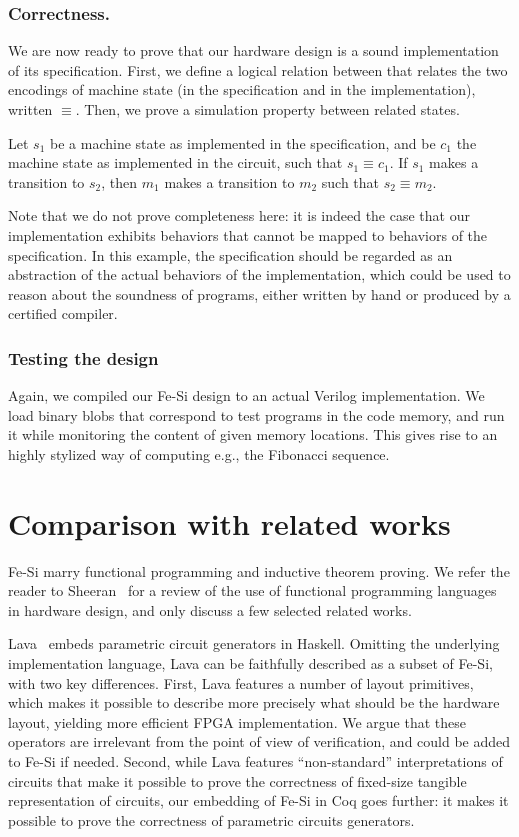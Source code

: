 \documentclass{llncs}
\begin{document}
\subsubsection{Correctness.} We are now ready to prove that our
hardware design is a sound implementation of its specification. 
%
First, we define a logical relation between that relates the two
encodings of machine state (in the specification and in the
implementation), written $\equiv$. 
%
Then, we prove a simulation property between related states.
\begin{theorem}
  Let $s_1$ be a machine state as implemented in the specification, and
  be $c_1$ the machine state as implemented in the circuit, such that
  $s_1 \equiv c_1$.
%
  If $s_1$ makes a transition to $s_2$, then $m_1$ makes a transition
  to $m_2$ such that $s_2 \equiv m_2$.
\end{theorem}
Note that we do not prove completeness here: it is indeed the case
that our implementation exhibits behaviors that cannot be mapped to
behaviors of the specification. 
%
In this example, the specification should be regarded as an
abstraction of the actual behaviors of the implementation, which could
be used to reason about the soundness of programs, either written by
hand or produced by a certified compiler.
%

\subsubsection{Testing the design}
Again, we compiled our Fe-Si design to an actual Verilog
implementation. We load binary blobs that correspond to test programs
in the code memory, and run it while monitoring the content of given
memory locations. This gives rise to an highly stylized way of
computing e.g., the Fibonacci sequence.

\section{Comparison with related works}\label{sec:rw}
Fe-Si marry functional programming and inductive theorem proving.
%
We refer the reader to Sheeran~\cite{DBLP:journals/jucs/Sheeran05} for
a review of the use of functional programming languages in hardware
design, and only discuss a few selected related works.

\medskip

Lava~\cite{Bjesse98lava:hardware} embeds parametric circuit generators
in Haskell. 
%
Omitting the underlying implementation language, Lava can be
faithfully described as a subset of Fe-Si, with two key differences.
%
First, Lava features a number of layout primitives, which makes it
possible to describe more precisely what should be the hardware
layout, yielding more efficient FPGA implementation. We argue that
these operators are irrelevant from the point of view of verification,
and could be added to Fe-Si if needed.
%
Second, while Lava features ``non-standard'' interpretations of
circuits that make it possible to prove the correctness of fixed-size
tangible representation of circuits, our embedding of Fe-Si in Coq
goes further: it makes it possible to prove the correctness of
parametric circuits generators.
\end{document}
